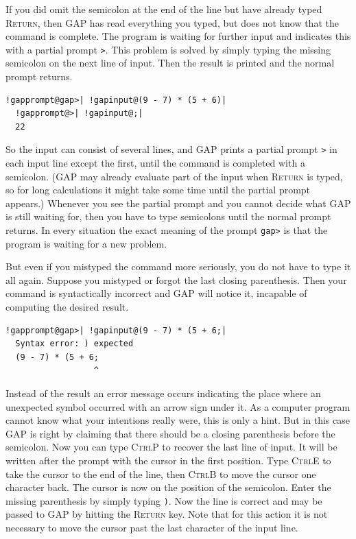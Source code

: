 \documentclass[a4paper,11pt]{report}
\begin{document}
{{ If you did omit the semicolon at the end of the line but have already typed \textsc{Return}, then \textsf{GAP} has read everything you typed, but does not know that the command is complete.
The program is waiting for further input and indicates this with a partial
prompt \texttt{{\textgreater}}. This problem is solved by simply typing the missing semicolon on the next
line of input. Then the result is printed and the normal prompt returns. 

 
\begin{Verbatim}[commandchars=!@|,fontsize=\small,frame=single,label=Example]
  !gapprompt@gap>| !gapinput@(9 - 7) * (5 + 6)|
  !gapprompt@>| !gapinput@;|
  22
\end{Verbatim}
 

 So the input can consist of several lines, and \textsf{GAP} prints a partial prompt \texttt{{\textgreater}} in each input line except the first, until the command is completed with a
semicolon. (\textsf{GAP} may already evaluate part of the input when \textsc{Return} is typed, so for long calculations it might take some time until the partial
prompt appears.) Whenever you see the partial prompt and you cannot decide
what \textsf{GAP} is still waiting for, then you have to type semicolons until the normal prompt
returns. In every situation the exact meaning of the prompt \texttt{gap{\textgreater}} is that the program is waiting for a new problem. 

 But even if you mistyped the command more seriously, you do not have to type
it all again. Suppose you mistyped or forgot the last closing parenthesis.
Then your command is syntactically incorrect and \textsf{GAP} will notice it, incapable of computing the desired result. 

 
\begin{Verbatim}[commandchars=!@|,fontsize=\small,frame=single,label=Example]
  !gapprompt@gap>| !gapinput@(9 - 7) * (5 + 6;|
  Syntax error: ) expected
  (9 - 7) * (5 + 6;
                  ^
\end{Verbatim}
 

  Instead of the result an error message occurs indicating the place where an
unexpected symbol occurred with an arrow sign \texttt{\texttt{}} under it. As a computer program cannot know what your intentions really were,
this is only a hint. But in this case \textsf{GAP} is right by claiming that there should be a closing parenthesis before the
semicolon. Now you can type \textsc{Ctrl\texttt{}P} to recover the last line of input. It will be written after the prompt with
the cursor in the first position. Type \textsc{Ctrl\texttt{}E} to take the cursor to the end of the line, then \textsc{Ctrl\texttt{}B} to move the cursor one character back. The cursor is now on the position of
the semicolon. Enter the missing parenthesis by simply typing \texttt{)}. Now the line is correct and may be passed to \textsf{GAP} by hitting the \textsc{Return} key. Note that for this action it is not necessary to move the cursor past the
last character of the input line. 

}}
\end{document}
